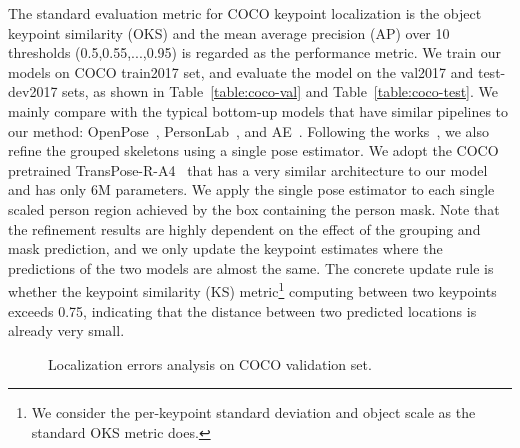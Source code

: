 \documentclass{article} \usepackage{iclr_conference,times}
\begin{document}
The standard evaluation metric for COCO keypoint localization is the object keypoint similarity (OKS) and the mean average precision (AP) over 10 thresholds (0.5,0.55,...,0.95) is regarded as the performance metric. 
We train our models on COCO train2017 set, and evaluate the model on the val2017 and test-dev2017 sets, as shown in Table~\ref{table:coco-val} and Table~\ref{table:coco-test}.
We mainly compare with the typical bottom-up models that have similar pipelines to our method: OpenPose~\citep{openpose:cao2017realtime}, PersonLab~\citep{personlab:papandreou2018personlab}, and AE~\citep{ae:newell2016associative}.
Following the works~\citep{openpose:cao2017realtime,ae:newell2016associative}, we also refine the grouped skeletons using a single pose estimator. 
We adopt the COCO pretrained TransPose-R-A4~\citep{transpose:yang2021transpose} that has a very similar architecture to our model and has only 6M parameters. 
We apply the single pose estimator to each single scaled person region achieved by the box containing the person mask. 
Note that the refinement results are highly dependent on the effect of the grouping and mask prediction, and we only update the keypoint estimates where the predictions of the two models are almost the same.
The concrete update rule is whether the keypoint similarity (KS) metric\footnote{We consider the per-keypoint standard deviation and object scale as the standard OKS metric does.} computing between two keypoints exceeds 0.75, indicating that the distance between two predicted locations is already very small.




\newcommand{\mysize}{0.2 \columnwidth}

\begin{figure}[hp]\centering    

\quad
{}
\quad
{}
\quad
{}


\caption{Localization errors analysis on COCO validation set.}
\label{fig:error}
\end{figure}
\end{document}
